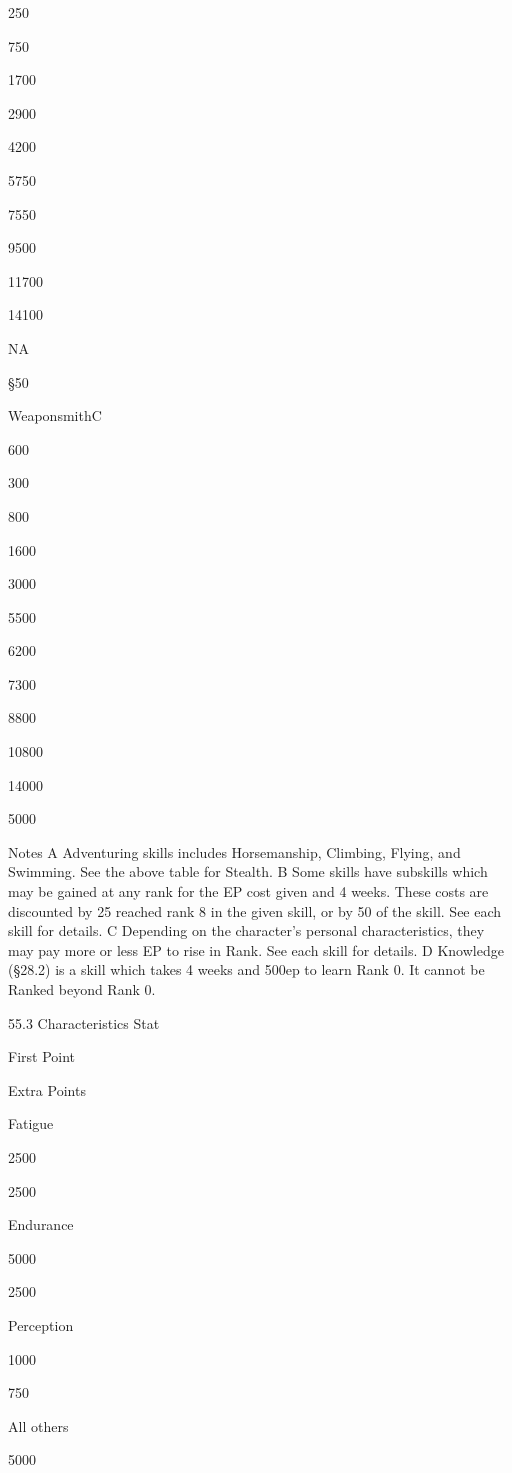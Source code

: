 \documentclass[a4paper]{article}
\begin{document}
\begin{multicols}{3}
250

750

1700

2900

4200

5750

7550

9500

11700

14100

NA

§50

WeaponsmithC

600

300

800

1600

3000

5500

6200

7300

8800

10800

14000

5000

Notes
A Adventuring skills includes Horsemanship, Climbing, Flying, and Swimming. See the above table for Stealth.
B Some skills have subskills which may be gained at any rank for the EP cost
given and 4 weeks. These costs are discounted by 25%
reached rank 8 in the given skill, or by 50%
of the skill. See each skill for details.
C Depending on the character’s personal characteristics, they may pay more or
less EP to rise in Rank. See each skill for details.
D Knowledge (§28.2) is a skill which takes 4 weeks and 500ep to learn Rank 0.
It cannot be Ranked beyond Rank 0.

55.3 Characteristics
Stat

First Point

Extra Points

Fatigue

2500

2500

Endurance

5000

2500

Perception

1000

750

All others

5000


\end{multicols}
\end{document}
